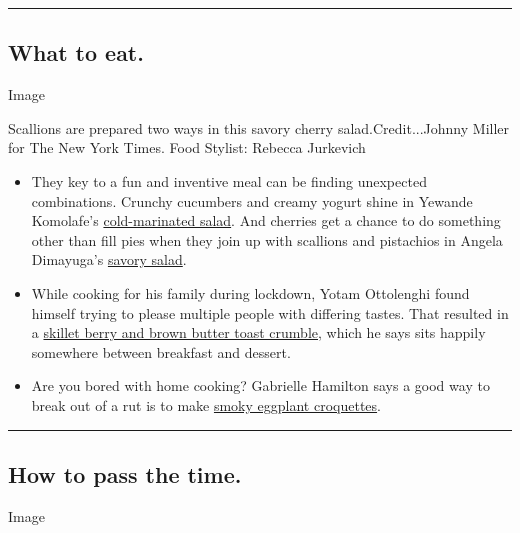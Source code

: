 \begin{center}\rule{0.5\linewidth}{\linethickness}\end{center}

\hypertarget{what-to-eat}{%
\subsection{What to eat.}\label{what-to-eat}}

Image

Scallions are prepared two ways in this savory cherry
salad.Credit...Johnny Miller for The New York Times. Food Stylist:
Rebecca Jurkevich

\begin{itemize}
\item
  They key to a fun and inventive meal can be finding unexpected
  combinations. Crunchy cucumbers and creamy yogurt shine in Yewande
  Komolafe's
  \href{https://www.nytimes.com/2020/07/27/dining/cucumbers-yogurt-recipe.html}{cold-marinated
  salad}. And cherries get a chance to do something other than fill pies
  when they join up with scallions and pistachios in Angela Dimayuga's
  \href{https://www.nytimes.com/2020/07/24/dining/cherry-salad-recipe.html}{savory
  salad}.
\item
  While cooking for his family during lockdown, Yotam Ottolenghi found
  himself trying to please multiple people with differing tastes. That
  resulted in a
  \href{https://www.nytimes.com/2020/07/27/dining/breakfast-crumble-recipe.html}{skillet
  berry and brown butter toast crumble}, which he says sits happily
  somewhere between breakfast and dessert.
\item
  Are you bored with home cooking? Gabrielle Hamilton says a good way to
  break out of a rut is to make
  \href{https://www.nytimes.com/2020/07/29/magazine/bored-with-your-home-cooking-some-smoky-eggplant-will-fix-that.html}{smoky
  eggplant croquettes}.
\end{itemize}

\begin{center}\rule{0.5\linewidth}{\linethickness}\end{center}

\hypertarget{how-to-pass-the-time}{%
\subsection{How to pass the time.}\label{how-to-pass-the-time}}

Image

